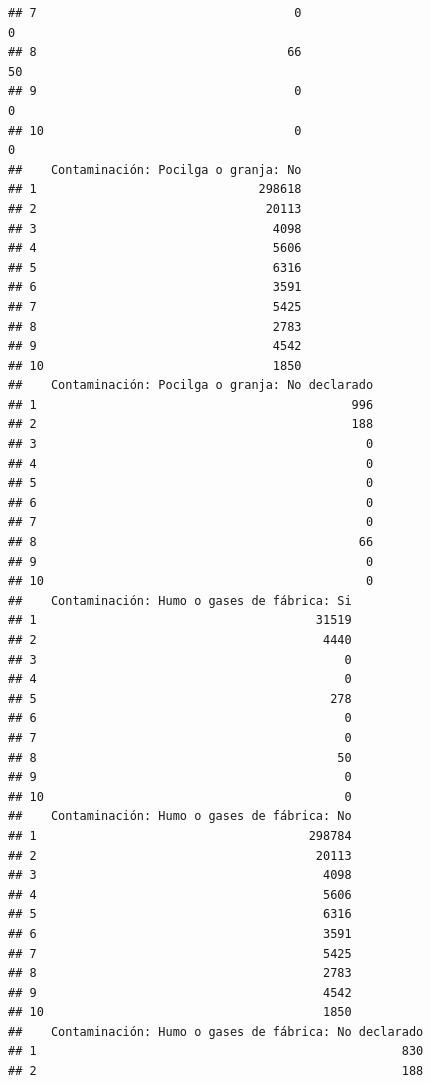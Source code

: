 \documentclass[11pt,]{article}
\begin{document}
\begin{verbatim}
## 7                                    0                                   0
## 8                                   66                                  50
## 9                                    0                                   0
## 10                                   0                                   0
##    Contaminación: Pocilga o granja: No
## 1                               298618
## 2                                20113
## 3                                 4098
## 4                                 5606
## 5                                 6316
## 6                                 3591
## 7                                 5425
## 8                                 2783
## 9                                 4542
## 10                                1850
##    Contaminación: Pocilga o granja: No declarado
## 1                                            996
## 2                                            188
## 3                                              0
## 4                                              0
## 5                                              0
## 6                                              0
## 7                                              0
## 8                                             66
## 9                                              0
## 10                                             0
##    Contaminación: Humo o gases de fábrica: Si
## 1                                       31519
## 2                                        4440
## 3                                           0
## 4                                           0
## 5                                         278
## 6                                           0
## 7                                           0
## 8                                          50
## 9                                           0
## 10                                          0
##    Contaminación: Humo o gases de fábrica: No
## 1                                      298784
## 2                                       20113
## 3                                        4098
## 4                                        5606
## 5                                        6316
## 6                                        3591
## 7                                        5425
## 8                                        2783
## 9                                        4542
## 10                                       1850
##    Contaminación: Humo o gases de fábrica: No declarado
## 1                                                   830
## 2                                                   188

\end{verbatim}
\end{document}

